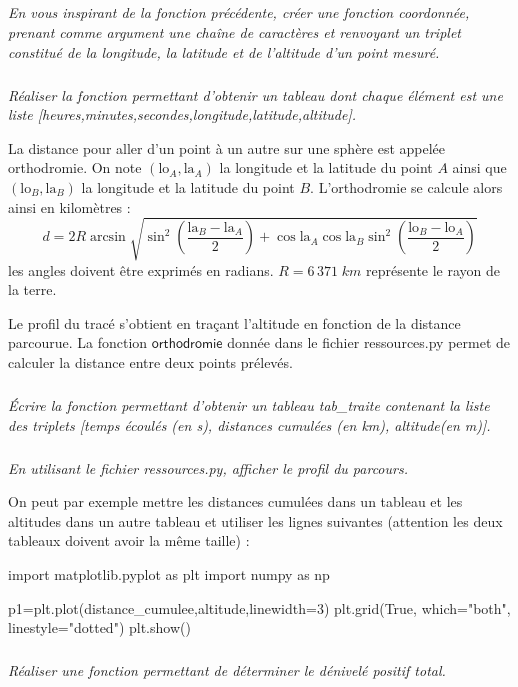\documentclass[10pt,oneside]{article}
\begin{document}
\subparagraph{}
\textit{En vous inspirant de la fonction précédente, créer une fonction \textsf{coordonnée}, prenant comme argument une chaîne de caractères et renvoyant un triplet constitué de la longitude, la latitude et de l'altitude d'un point mesuré.}


\subparagraph{}
\textit{Réaliser la fonction permettant d'obtenir un tableau dont chaque élément est une liste \textsf{[heures,minutes,secondes,longitude,latitude,altitude]}.}

La distance pour aller d'un point à un autre sur une sphère est appelée orthodromie. On note $(\text{lo}_A,\text{la}_A)$ la longitude et la latitude du point $A$ ainsi que $(\text{lo}_B,\text{la}_B)$ la longitude et la latitude du point $B$. L'orthodromie se calcule alors ainsi en kilomètres : 
$$
d = 2R\arcsin \sqrt{\sin^2\left( \dfrac{\text{la}_B-\text{la}_A}{2}\right) + \cos \text{la}_A \cos \text{la}_B \sin^2\left( \dfrac{\text{lo}_B-\text{lo}_A}{2}\right)}
$$
les angles doivent être exprimés en radians. $R=6\,371\; km$ représente le rayon de la terre.

Le profil du tracé s'obtient en traçant l'altitude en fonction de la distance parcourue. La fonction $\textsf{orthodromie}$ donnée dans le fichier \textsf{ressources.py} permet de calculer la distance entre deux points prélevés.

\subparagraph{}
\textit{Écrire la fonction permettant d'obtenir un tableau \textsf{tab\_traite} contenant la liste des triplets \textsf{[temps écoulés (en s), distances cumulées (en km), altitude(en m)]}.}


\subparagraph{}
\textit{En utilisant le fichier \textsf{ressources.py}, afficher le profil du parcours.}


\begin{py}
On peut par exemple mettre les distances cumulées dans un tableau et les altitudes dans un autre tableau et utiliser les lignes suivantes (attention les deux tableaux doivent avoir la même taille) :
\end{py}

\begin{py}
\begin{python}
import matplotlib.pyplot as plt
import numpy as np

p1=plt.plot(distance_cumulee,altitude,linewidth=3)
plt.grid(True, which="both", linestyle="dotted")
plt.show()
\end{python}
\end{py}

\subparagraph{}
\textit{Réaliser une fonction permettant de déterminer le dénivelé positif total.}
\end{document}
